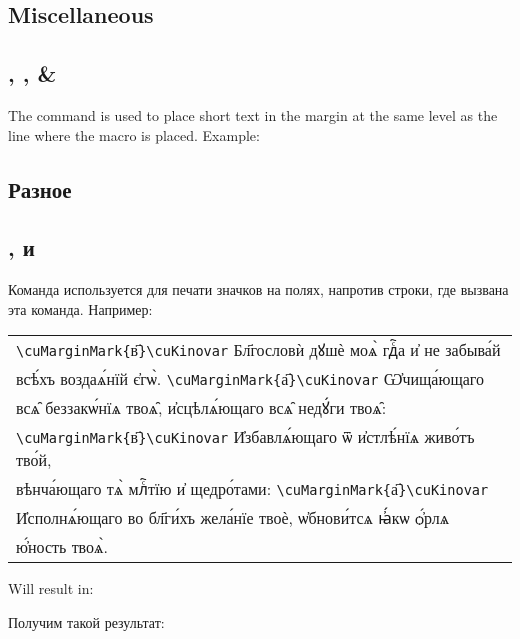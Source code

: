 \begin{EN}
\section{Miscellaneous}
\subsection{, , \& }
The command  is used to place short text in the margin
at the same level as the line where the macro is placed.
Example:
\end{EN}
%
\begin{RU}
\section{Разное}
\subsection{,  и }
Команда  используется для печати значков на полях,
напротив строки, где вызвана эта команда.
Например:
\end{RU}
%
\begin{center}
\begin{churchslavonic}
\begin{tabular}{l}
  \verb+\cuMarginMark{+в҃\verb+}\cuKinovar+ Бл҃гословѝ дꙋшѐ моѧ̀ гдⷭ҇а и҆ не забыва́й\\
  всѣ́хъ воздаѧ́нїй є҆гѡ̀. \verb+\cuMarginMark{+а҃\verb+}\cuKinovar+ Ѡ҆чища́ющаго \\
  всѧ̑ беззакѡ́нїѧ твоѧ̑, и҆сцѣлѧ́ющаго  всѧ̑ недꙋ́ги твоѧ̑: \\
  \verb+\cuMarginMark{+в҃\verb+}\cuKinovar+ И҆збавлѧ́ющаго ѿ и҆стлѣ́нїѧ  живо́тъ тво́й,\\
  вѣнча́ющаго тѧ̀ млⷭ҇тїю и҆ щедро́тами: \verb+\cuMarginMark{+а҃\verb+}\cuKinovar+\\
  И҆сполнѧ́ющаго во бл҃ги́хъ жела́нїе твоѐ, ѡ҆бнови́тсѧ  ꙗ҆́кѡ ѻ҆́рлѧ \\
  ю҆́ность твоѧ̀.
\end{tabular}
\end{churchslavonic}
\end{center}

\begin{EN}
\noindent
Will result in:
\end{EN}
%
\begin{RU}
\noindent
Получим такой результат:
\end{RU}

